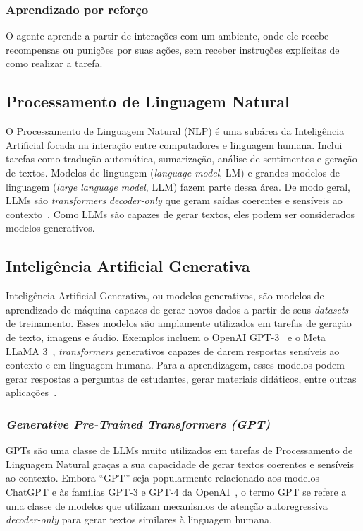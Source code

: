\documentclass[journal]{IEEEtran}
\begin{document}
\subsubsection{Aprendizado por reforço}
O agente aprende a partir de interações com um ambiente, onde ele recebe recompensas ou punições por suas ações, sem receber instruções explícitas de como realizar a tarefa.

\subsection{Processamento de Linguagem Natural}

\noindent%
O Processamento de Linguagem Natural (NLP) é uma subárea da Inteligência Artificial focada na interação entre computadores e linguagem humana.
Inclui tarefas como tradução automática, sumarização, análise de sentimentos e geração de textos.
Modelos de linguagem (\textit{language model}, LM) e grandes modelos de linguagem (\textit{large language model}, LLM) fazem parte dessa área.
De modo geral, LLMs são \textit{transformers} \textit{decoder-only} que geram saídas coerentes e sensíveis ao contexto~\cite{vaswani2017attention}.
Como LLMs são capazes de gerar textos, eles podem ser considerados modelos generativos.

\subsection{Inteligência Artificial Generativa}

\noindent%
Inteligência Artificial Generativa, ou modelos generativos, são modelos de aprendizado de máquina capazes de gerar novos dados a partir de seus \textit{datasets} de treinamento.
Esses modelos são amplamente utilizados em tarefas de geração de texto, imagens e áudio.
Exemplos incluem o OpenAI GPT-3~\cite{floridi2020gpt} e o Meta LLaMA 3~\cite{meta2024llama3}, \textit{transformers} generativos capazes de darem respostas sensíveis ao contexto e em linguagem humana.
Para a aprendizagem, esses modelos podem gerar respostas a perguntas de estudantes, gerar materiais didáticos, entre outras aplicações~\cite{da2023chatgpt,kasneci2023chatgpt,jeon2023large}.

\subsubsection{\textit{Generative Pre-Trained Transformers (GPT)}}
GPTs são uma classe de LLMs muito utilizados em tarefas de Processamento de Linguagem Natural graças a sua capacidade de gerar textos coerentes e sensíveis ao contexto.
Embora ``GPT'' seja popularmente relacionado aos modelos ChatGPT e às famílias GPT-3 e GPT-4 da OpenAI~\cite{floridi2020gpt}, o termo GPT se refere a uma classe de modelos que utilizam mecanismos de atenção autoregressiva \textit{decoder-only} para gerar textos similares à linguagem humana.
\end{document}
